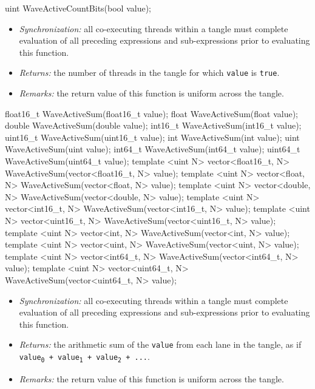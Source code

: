 \begin{HLSL}
uint WaveActiveCountBits(bool value);
\end{HLSL}

\begin{itemize}
  \item \textit{Synchronization:} all co-executing threads within a \gls{tangle}
  must complete evaluation of all preceding expressions and sub-expressions
  prior to evaluating this function.
  \item \textit{Returns:} the number of threads in the \gls{tangle} for which
  \texttt{value} is \texttt{true}.
  \item \textit{Remarks:} the return value of this function is uniform across
  the \gls{tangle}.
\end{itemize}

\begin{HLSL}
float16_t WaveActiveSum(float16_t value);
float WaveActiveSum(float value);
double WaveActiveSum(double value);
int16_t WaveActiveSum(int16_t value);
uint16_t WaveActiveSum(uint16_t value);
int WaveActiveSum(int value);
uint WaveActiveSum(uint value);
int64_t WaveActiveSum(int64_t value);
uint64_t WaveActiveSum(uint64_t value);
template <uint N> vector<float16_t, N> WaveActiveSum(vector<float16_t, N> value);
template <uint N> vector<float, N> WaveActiveSum(vector<float, N> value);
template <uint N> vector<double, N> WaveActiveSum(vector<double, N> value);
template <uint N> vector<int16_t, N> WaveActiveSum(vector<int16_t, N> value);
template <uint N> vector<uint16_t, N> WaveActiveSum(vector<uint16_t, N> value);
template <uint N> vector<int, N> WaveActiveSum(vector<int, N> value);
template <uint N> vector<uint, N> WaveActiveSum(vector<uint, N> value);
template <uint N> vector<int64_t, N> WaveActiveSum(vector<int64_t, N> value);
template <uint N> vector<uint64_t, N> WaveActiveSum(vector<uint64_t, N> value);
\end{HLSL}

\begin{itemize}
  \item \textit{Synchronization:} all co-executing threads within a \gls{tangle}
  must complete evaluation of all preceding expressions and sub-expressions
  prior to evaluating this function.
  \item \textit{Returns:} the arithmetic sum of the \texttt{value} from each
  \gls{lane} in the \gls{tangle}, as if \texttt{value\textsubscript{0} +
  value\textsubscript{1} + value\textsubscript{2} + ...}.
  \item \textit{Remarks:} the return value of this function is uniform across
  the \gls{tangle}.
\end{itemize}

